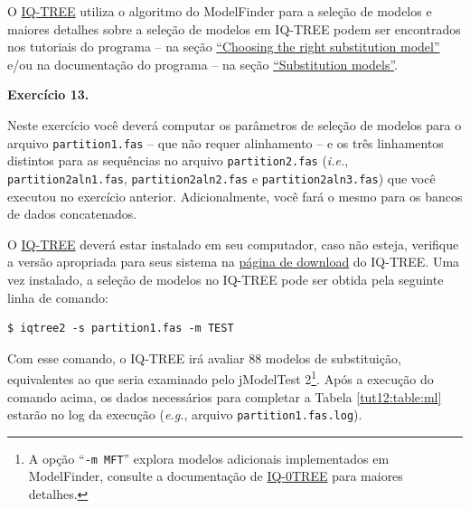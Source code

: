 \begin{refsection}
O \href{http://www.iqtree.org/}{IQ-TREE} utiliza o algoritmo do ModelFinder \parencite{kalyaanamoorthy_et_al_2017} para a seleção de modelos e maiores detalhes sobre a seleção de modelos em IQ-TREE podem ser encontrados nos tutoriais do programa -- na seção \href{http://www.iqtree.org/doc/Tutorial#choosing-the-right-substitution-model}{``Choosing the right substitution model''} e/ou na documentação do programa -- na seção \href{http://www.iqtree.org/doc/Substitution-Models}{``Substitution models''}.\\


\begin{blackBlock}{\textbf{Exercício 13.}}\label{tut12:ex:13.6}

Neste exercício você deverá computar os parâmetros de seleção de modelos para o arquivo \texttt{partition1.fas} -- que não requer alinhamento -- e os três linhamentos distintos para as sequências no arquivo \texttt{partition2.fas} (\textit{i.e.}, \texttt{partition2aln1.fas}, \texttt{partition2aln2.fas} e \texttt{partition2aln3.fas}) que você executou no exercício anterior. Adicionalmente, você fará o mesmo para os bancos de dados concatenados.

\end{blackBlock}

\vspace{10pt}

O \href{http://www.iqtree.org/}{IQ-TREE} deverá estar instalado em seu computador, caso não esteja, verifique a versão apropriada para seus sistema na \href{http://www.iqtree.org/#download}{página de download} do IQ-TREE. Uma vez instalado, a seleção de modelos no IQ-TREE pode ser obtida pela seguinte linha de comando:

\begin{lstlisting}
$ iqtree2 -s partition1.fas -m TEST
\end{lstlisting}

Com esse comando, o IQ-TREE irá avaliar 88 modelos de substituição, equivalentes ao que seria examinado pelo jModelTest 2\footnote{ A opção ``\texttt{-m MFT}'' explora modelos adicionais implementados em ModelFinder, consulte a documentação de \href{http://www.iqtree.org/doc/Substitution-Models}{IQ-0TREE} para maiores detalhes.}. Após a execução do comando acima, os dados necessários para completar a Tabela \ref{tut12:table:ml} estarão no log da execução (\textit{e.g.}, arquivo \texttt{\texttt{partition1.fas.log}}).

\end{refsection}
